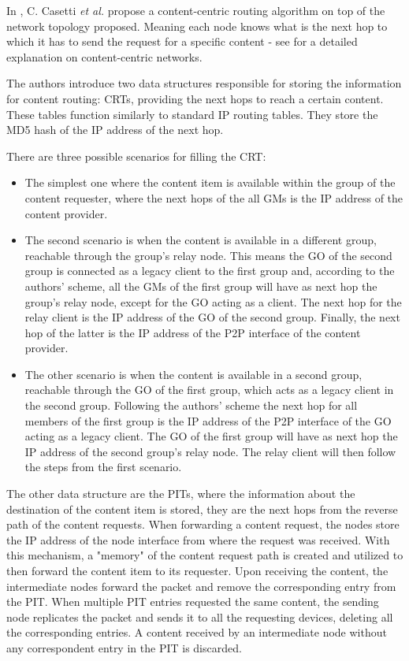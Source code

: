 In \cite{routeMultiGroup}, C. Casetti \textit{et al.} propose a content-centric routing algorithm on top of the network topology proposed. Meaning each node knows what is the next hop to which it has to send the request for a specific content - see \cite{contentcentric} for a detailed explanation on content-centric networks.

The authors introduce two data structures responsible for storing the information for content routing: \glspl{CRT}, providing the next hops to reach a certain content. These tables function similarly to standard \gls{IP} routing tables. They store the MD5 hash of the \gls{IP} address of the next hop.

There are three possible scenarios for filling the \gls{CRT}:
\begin{itemize}
\item The simplest one where the content item is available within the group of the content requester, where the next hops of the all \glspl{GM} is the \gls{IP} address of the content provider.

\item The second scenario is when the content is available in a different group, reachable through the group's relay node. This means the \gls{GO} of the second group is connected as a legacy client to the first group and, according to the authors' scheme, all the \glspl{GM} of the first group will have as next hop the group's relay node, except for the \gls{GO} acting as a client. The next hop for the relay client is the \gls{IP} address of the \gls{GO} of the second group. Finally, the next hop of the latter is the \gls{IP} address of the P2P interface of the content provider.

\item The other scenario is when the content is available in a second group, reachable through the \gls{GO} of the first group, which acts as a legacy client in the second group. Following the authors' scheme the next hop for all members of the first group is the \gls{IP} address of the P2P interface of the \gls{GO} acting as a legacy client. The \gls{GO} of the first group will have as next hop the \gls{IP} address of the second group's relay node. The relay client will then follow the steps from the first scenario.
\end{itemize}

The other data structure are the \glspl{PIT}, where the information about the destination of the content item is stored, they are the next hops from the reverse path of the content requests. When forwarding a content request, the nodes store the \gls{IP} address of the node interface from where the request was received. With this mechanism, a "memory" of the content request path is created and utilized to then forward the content item to its requester. Upon receiving the content, the intermediate nodes forward the packet and remove the corresponding entry from the \gls{PIT}. When multiple \gls{PIT} entries requested the same content, the sending node replicates the packet and sends it to all the requesting devices, deleting all the corresponding entries. A content received by an intermediate node without any correspondent entry in the \gls{PIT} is discarded.

